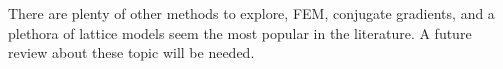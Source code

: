 There are plenty of other methods to explore, FEM, conjugate gradients, and
a plethora of lattice models seem the most popular in the literature. A future
review about these topic will be needed.




